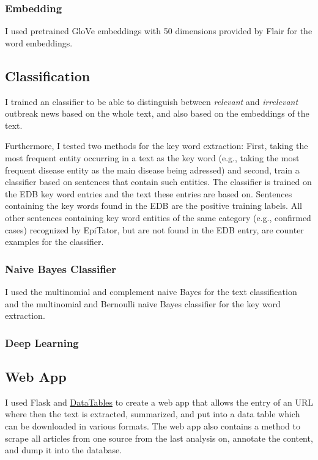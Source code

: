 \subsubsection{Embedding}
I used pretrained GloVe embeddings with 50 dimensions provided by Flair for the word embeddings.

\subsection{Classification}
I trained an classifier to be able to distinguish between \emph{relevant} and \emph{irrelevant} outbreak news based on the whole text, and also based on the embeddings of the text.

Furthermore, I tested two methods for the key word extraction: First, taking the most frequent entity occurring in a text as the key word (e.g., taking the most frequent disease entity as the main disease being adressed) and second, train a classifier based on sentences that contain such entities. The classifier is trained on the EDB key word entries and the text these entries are based on.
Sentences containing the key words found in the EDB are the positive training labels.
All other sentences containing key word entities of the same category (e.g., confirmed cases) recognized by EpiTator, but are not found in the EDB entry, are counter examples for the classifier.

\subsubsection{Naive Bayes Classifier}
I used the multinomial and complement naive Bayes for the text classification and the multinomial and Bernoulli naive Bayes classifier for the key word extraction.

\subsubsection{Deep Learning}

\subsection{Web App}
I used Flask and \href{https://www.datatables.net}{DataTables} to create a web app that allows the entry of an URL where then the text is extracted, summarized, and put into a data table which can be downloaded in various formats.
The web app also contains a method to scrape all articles from one source from the last analysis on, annotate the content, and dump it into the database.
